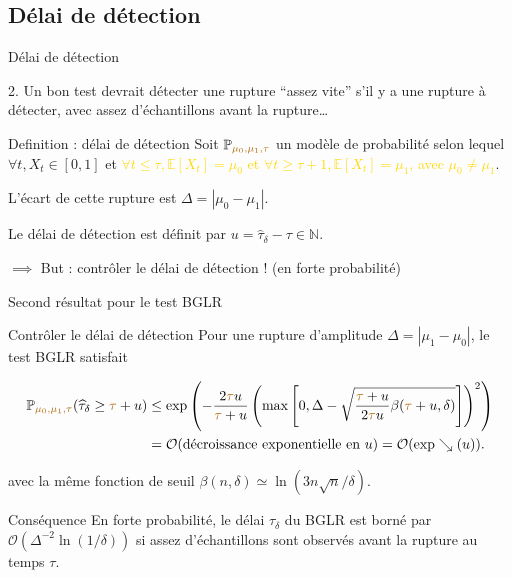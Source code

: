 \documentclass[11pt,french,ignorenonframetext,]{beamer}
\begin{document}
\subsection{\hfill{}Délai de détection\hfill{}}

\begin{frame}{Délai de détection}

  2. Un bon test devrait détecter une rupture ``assez vite'' s'il y a une rupture à détecter, avec assez d'échantillons avant la rupture\ldots

  \pause
  \begin{block}{Definition : délai de détection}
    Soit $\mathbb{P}_{\textcolor{gold}{\mu_0,\mu_1,\tau}}$ un modèle de probabilité selon lequel $\forall t, X_t \in[0,1]$ et \textcolor{gold}{$\forall t \leq \tau, \mathbb{E}[X_t] = \mu_0$ et $\forall t \geq \tau + 1, \mathbb{E}[X_t] = \mu_1$,
    avec $\mu_0 \neq \mu_1$}.

    L'\alert{écart} de cette rupture est $\Delta = |\mu_0 - \mu_1|$.

    Le \alert{délai de détection} est définit par $u = \widehat{\tau}_{\delta} - \tau \in\mathbb{N}$.
  \end{block}

  \alert{$\implies$ But : contrôler le délai de détection !} (en forte probabilité)

\end{frame}

\begin{frame}{Second résultat pour le test BGLR \dSmiley{}}

  \begin{block}{Contrôler le délai de détection}
      Pour une rupture d'amplitude $\Delta = |\mu_1 - \mu_0|$,
      le test BGLR satisfait
      \begin{small}
        \begin{align*}
            \mathbb{P}_{\textcolor{gold}{\mu_0,\mu_1,\tau}} (\widehat{\tau}_{\delta} \geq \textcolor{gold}{\tau} + u) &\leq \exp\left( -\frac{2\textcolor{gold}{\tau} u}{\textcolor{gold}{\tau} + u}\left(\max\left[ 0, \Delta - \sqrt{\frac{\textcolor{gold}{\tau} + u}{2\textcolor{gold}{\tau} u} \beta(\textcolor{gold}{\tau} + u,\delta)} \right]\right)^2 \right) \\
            &= \mathcal{O}(\text{décroissance exponentielle en~} u)
            = \mathcal{O}(\exp\searrow(u)).
        \end{align*}
      \end{small}
      avec la même fonction de seuil
      $\beta(n,\delta) \simeq \ln(3n \sqrt{n}/\delta)$.
  \end{block}

  \begin{exampleblock}{Conséquence}
    En forte probabilité, \alert{le délai $\widehat{\tau}_\delta$ du BGLR est borné} par $\mathcal{O}(\Delta^{-2} \ln(1/\delta))$ \alert{si assez d'échantillons sont observés avant la rupture} au temps $\tau$.
  \end{exampleblock}

\end{frame}
\end{document}
